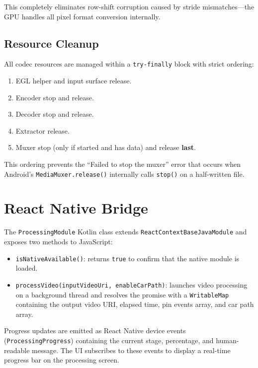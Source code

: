 \documentclass{zc-ust-hw}
\begin{document}
This completely eliminates row-shift corruption caused by stride mismatches—the GPU handles all pixel format conversion internally.

\subsection{Resource Cleanup}

All codec resources are managed within a \texttt{try-finally} block with strict ordering:
\begin{enumerate}
    \item EGL helper and input surface release.
    \item Encoder stop and release.
    \item Decoder stop and release.
    \item Extractor release.
    \item Muxer stop (only if started and has data) and release \textbf{last}.
\end{enumerate}

This ordering prevents the ``Failed to stop the muxer'' error that occurs when Android's \texttt{MediaMuxer.release()} internally calls \texttt{stop()} on a half-written file.

\section{React Native Bridge}

The \texttt{ProcessingModule} Kotlin class extends \texttt{ReactContextBaseJavaModule} and exposes two methods to JavaScript:

\begin{itemize}
    \item \texttt{isNativeAvailable()}: returns \texttt{true} to confirm that the native module is loaded.
    \item \texttt{processVideo(inputVideoUri, enableCarPath)}: launches video processing on a background thread and resolves the promise with a \texttt{WritableMap} containing the output video URI, elapsed time, pin events array, and car path array.
\end{itemize}

Progress updates are emitted as React Native device events (\texttt{ProcessingProgress}) containing the current stage, percentage, and human-readable message.
The UI subscribes to these events to display a real-time progress bar on the processing screen.
\end{document}

